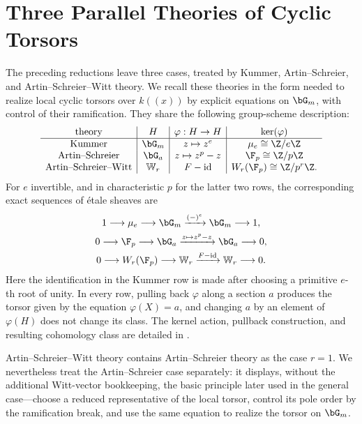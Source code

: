 \section{Three Parallel Theories of Cyclic Torsors}
\label{section:cyclic_extension_theories}
\providecommand{\bW}{\mathbb{W}}

The preceding reductions leave three cases, treated by Kummer,
Artin--Schreier, and Artin--Schreier--Witt theory. We recall these theories in
the form needed to realize local cyclic torsors over $k((x))$ by explicit
equations on $\bG_m$, with control of their ramification. They share the
following group-scheme description:
\[
\begin{array}{c|c|c|c}
\text{theory}&H&\varphi:H\to H&\ker(\varphi)\\ \hline
\text{Kummer}&\bG_m&z\mapsto z^e&\mu_e\cong\Z/e\Z\\
\text{Artin--Schreier}&\bG_a&z\mapsto z^p-z&\F_p\cong\Z/p\Z\\
\text{Artin--Schreier--Witt}&\bW_r&F-\mathrm{id}
    &W_r(\F_p)\cong\Z/p^r\Z.
\end{array}
\]
For $e$ invertible, and in characteristic $p$ for the latter two rows,
the corresponding exact sequences of \'etale sheaves are
\[
\begin{gathered}
1\longrightarrow\mu_e\longrightarrow\bG_m
\xrightarrow{(-)^e}\bG_m\longrightarrow1,\\
0\longrightarrow\F_p\longrightarrow\bG_a
\xrightarrow{z\mapsto z^p-z}\bG_a\longrightarrow0,\\
0\longrightarrow W_r(\F_p)\longrightarrow\bW_r
\xrightarrow{F-\mathrm{id}}\bW_r\longrightarrow0.
\end{gathered}
\]
Here the identification in the Kummer row is made after choosing a primitive
$e$-th root of unity. In every row, pulling back $\varphi$ along a section $a$
produces the torsor given by the equation $\varphi(X)=a$, and changing $a$ by
an element of $\varphi(H)$ does not change its class. The kernel action,
pullback construction, and resulting cohomology class are detailed in
.

Artin--Schreier--Witt theory contains Artin--Schreier theory as the case
$r=1$. We nevertheless treat the Artin--Schreier case separately: it displays,
without the additional Witt-vector bookkeeping, the basic principle later
used in the general case---choose a reduced representative of the local
torsor, control its pole order by the ramification break, and use the same
equation to realize the torsor on $\bG_m$.

